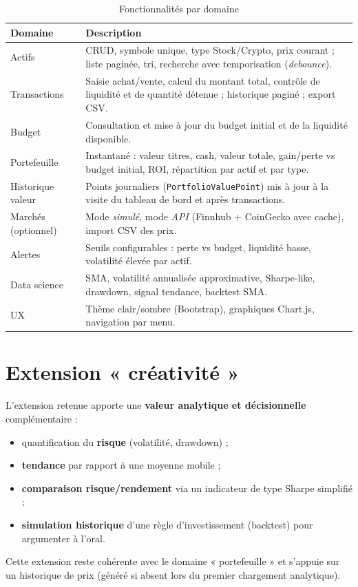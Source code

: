 \begin{table}[h]
  \centering
  \caption{Fonctionnalités par domaine}
  \begin{tabular}{@{}p{4.2cm}p{10cm}@{}}
    \toprule
    \textbf{Domaine} & \textbf{Description} \\
    \midrule
    Actifs & CRUD, symbole unique, type Stock/Crypto, prix courant ; liste paginée, tri, recherche avec temporisation (\emph{debounce}). \\
    Transactions & Saisie achat/vente, calcul du montant total, contrôle de liquidité et de quantité détenue ; historique paginé ; export CSV. \\
    Budget & Consultation et mise à jour du budget initial et de la liquidité disponible. \\
    Portefeuille & Instantané : valeur titres, cash, valeur totale, gain/perte vs budget initial, ROI, répartition par actif et par type. \\
    Historique valeur & Points journaliers (\texttt{PortfolioValuePoint}) mis à jour à la visite du tableau de bord et après transactions. \\
    Marchés (optionnel) & Mode \emph{simulé}, mode \emph{API} (Finnhub + CoinGecko avec cache), import CSV des prix. \\
    Alertes & Seuils configurables : perte vs budget, liquidité basse, volatilité élevée par actif. \\
    Data science & SMA, volatilité annualisée approximative, Sharpe-like, drawdown, signal tendance, backtest SMA. \\
    UX & Thème clair/sombre (Bootstrap), graphiques Chart.js, navigation par menu. \\
    \bottomrule
  \end{tabular}
\end{table}

\section{Extension « créativité »}

L'extension retenue apporte une \textbf{valeur analytique et décisionnelle} complémentaire :
\begin{itemize}[leftmargin=*]
  \item quantification du \textbf{risque} (volatilité, drawdown) ;
  \item \textbf{tendance} par rapport à une moyenne mobile ;
  \item \textbf{comparaison risque/rendement} via un indicateur de type Sharpe simplifié ;
  \item \textbf{simulation historique} d'une règle d'investissement (backtest) pour argumenter à l'oral.
\end{itemize}
Cette extension reste cohérente avec le domaine « portefeuille » et s'appuie sur un historique de prix (généré si absent lors du premier chargement analytique).
